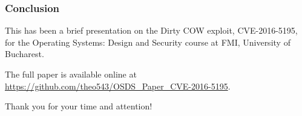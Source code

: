 \documentclass{beamer}
\begin{document}
\begin{frame}
\frametitle{Conclusion}

This has been a brief presentation on the Dirty COW exploit, CVE-2016-5195, for the Operating Systems: Design and Security course at FMI, University of Bucharest.

The full paper is available online at \url{https://github.com/theo543/OSDS_Paper_CVE-2016-5195}.

Thank you for your time and attention!

\end{frame}
\end{document}
